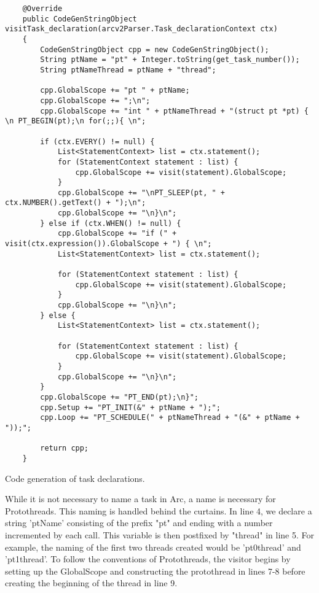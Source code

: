 \begin{listing}[htb!]
    \begin{verbatim}
    @Override
    public CodeGenStringObject visitTask_declaration(arcv2Parser.Task_declarationContext ctx)
    {
        CodeGenStringObject cpp = new CodeGenStringObject();
        String ptName = "pt" + Integer.toString(get_task_number());
        String ptNameThread = ptName + "thread";

        cpp.GlobalScope += "pt " + ptName;
        cpp.GlobalScope += ";\n";
        cpp.GlobalScope += "int " + ptNameThread + "(struct pt *pt) { \n PT_BEGIN(pt);\n for(;;){ \n";

        if (ctx.EVERY() != null) {
            List<StatementContext> list = ctx.statement();
            for (StatementContext statement : list) {
                cpp.GlobalScope += visit(statement).GlobalScope;
            }
            cpp.GlobalScope += "\nPT_SLEEP(pt, " + ctx.NUMBER().getText() + ");\n";
            cpp.GlobalScope += "\n}\n";
        } else if (ctx.WHEN() != null) {
            cpp.GlobalScope += "if (" + visit(ctx.expression()).GlobalScope + ") { \n";
            List<StatementContext> list = ctx.statement();

            for (StatementContext statement : list) {
                cpp.GlobalScope += visit(statement).GlobalScope;
            }
            cpp.GlobalScope += "\n}\n";
        } else {
            List<StatementContext> list = ctx.statement();
            
            for (StatementContext statement : list) {
                cpp.GlobalScope += visit(statement).GlobalScope;
            }
            cpp.GlobalScope += "\n}\n";
        }
        cpp.GlobalScope += "PT_END(pt);\n}";
        cpp.Setup += "PT_INIT(&" + ptName + ");";
        cpp.Loop += "PT_SCHEDULE(" + ptNameThread + "(&" + ptName + "));";

        return cpp;
    }
    \end{verbatim}
    \caption{Code generation of task declarations.}
    \label{lst:codeGenTask}
\end{listing}


While it is not necessary to name a task in Arc, a name is necessary for Protothreads. This naming is handled behind the curtains. In line 4, we declare a string 'ptName' consisting of the prefix "pt" and ending with a number incremented by each call. This variable is then postfixed by "thread" in line 5. For example, the naming of the first two threads created would be 'pt0thread' and 'pt1thread'. To follow the conventions of Protothreads, the visitor begins by setting up the GlobalScope and constructing the protothread in lines 7-8 before creating the beginning of the thread in line 9.


